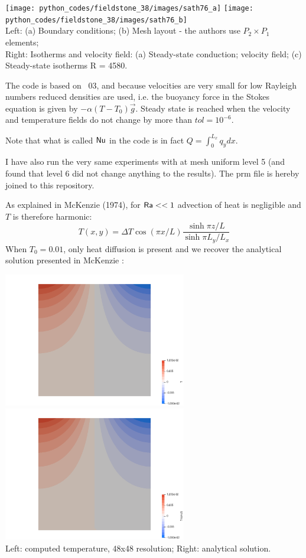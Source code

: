 \begin{center}
\texttt{[image: python\_codes/fieldstone\_38/images/sath76\_a]}
\texttt{[image: python\_codes/fieldstone\_38/images/sath76\_b]}\\
{\captionfont Left: (a) Boundary conditions; (b) Mesh layout - the authors
use $P_2\times P_1$ elements;\\
Right: Isotherms and velocity field: (a) Steady-state conduction;
velocity field; (c) Steady-state isotherms R = 4580.}
\end{center}

The code is based on \stone~03, and because velocities are very small for low Rayleigh numbers
reduced densities are used, i.e. the buoyancy force in the Stokes equation is given by $-\alpha(T-T_0)\vec{g}$.
Steady state is reached when the velocity and temperature fields do not change by more than $tol=10^{-6}$.

Note that what is called ${\mathsf{Nu}}$ in the code is in fact $Q=\int_0^{L_x} q_y dx$.

I have also run the very same experiments with \aspect{} at mesh uniform level 5 (and found that 
level 6 did not change anything to the results). The prm file is hereby joined to this repository.

As explained in McKenzie \etal (1974), for ${\mathsf{Ra}} <<1$ advection of heat is negligible and $T$ is 
therefore harmonic:
\[
T(x,y) = \Delta T \cos (\pi x/L) \frac{\sinh \pi z/L}{\sinh \pi L_y/L_x}
\]
When $T_0=0.01$, only heat diffusion is present and we recover the analytical solution presented 
in McKenzie \etal:

\begin{center}
\includegraphics[width=8cm]{python_codes/fieldstone_38/results/T0_0p001_32x32/T}
\includegraphics[width=8cm]{python_codes/fieldstone_38/results/T0_0p001_32x32/T_anal}\\
{\captionfont Left: computed temperature, 48x48 resolution; Right: analytical solution.}
\end{center}

